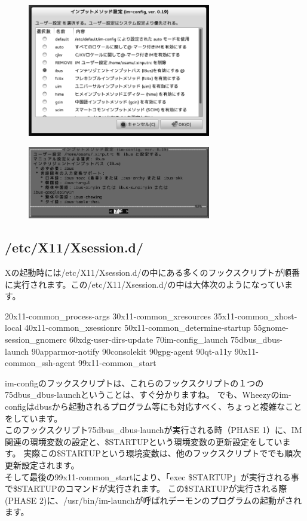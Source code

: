 \documentclass[mingoth,a4paper]{jsarticle}
\begin{document}
\begin{figure}[htbp]
 \begin{minipage}{0.5\hsize}
  \begin{center}
   \includegraphics[width=8cm]{image201212/im06_mono.png}
  \end{center}
  \label{fig:one}
 \end{minipage}
 \begin{minipage}{0.5\hsize}
  \begin{center}
   \includegraphics[width=8cm]{image201212/im07_mono.png}
  \end{center}
  \label{fig:two}
 \end{minipage}
\end{figure}

\subsection{/etc/X11/Xsession.d/}
Xの起動時には/etc/X11/Xsession.d/の中にある多くのフックスクリプトが順番に実行されます。この/etc/X11/Xsession.d/の中は大体次のようになっています。
\begin{commandline}
20x11-common_process-args
30x11-common_xresources
35x11-common_xhost-local
40x11-common_xsessionrc
50x11-common_determine-startup
55gnome-session_gnomerc
60xdg-user-dirs-update
70im-config_launch
75dbus_dbus-launch
90apparmor-notify
90consolekit
90gpg-agent
90qt-a11y
90x11-common_ssh-agent
99x11-common_start
\end{commandline}
im-configのフックスクリプトは、これらのフックスクリプトの１つの75dbus\_dbus-launchということは、すぐ分かりますね。
でも、Wheezyのim-configはdbusから起動されるプログラム等にも対応すべく、ちょっと複雑なことをしています。
\\
このフックスクリプト75dbus\_dbus-launchが実行される時（PHASE 1）に、IM関連の環境変数の設定と、\$STARTUPという環境変数の更新設定をしています。
実際この\$STARTUPという環境変数は、他のフックスクリプトででも順次更新設定されます。
\\
そして最後の99x11-common\_startにより、「exec \$STARTUP」が実行される事で\$STARTUPのコマンドが実行されます。
この\$STARTUPが実行される際(PHASE 2)に、/usr/bin/im-launchが呼ばれデーモンのプログラムの起動がされます。
\end{document}
